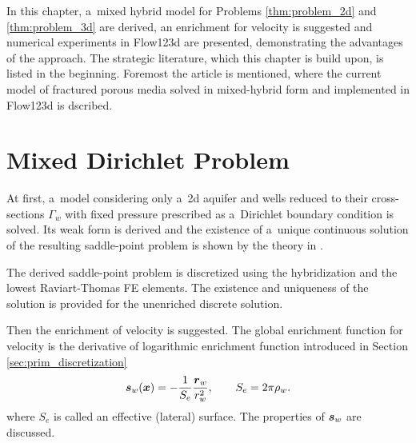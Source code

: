 
In this chapter, a~mixed hybrid model for Problems \ref{thm:problem_2d} and \ref{thm:problem_3d} are derived,
an enrichment for velocity is suggested and numerical experiments in Flow123d are presented, demonstrating
the advantages of the approach.
The strategic literature, which this chapter is build upon, is listed in the beginning.
Foremost the article \cite{sistek_bddc_2015} is mentioned, where the current model 
of fractured porous media solved in mixed-hybrid form and implemented in Flow123d is dscribed.


\section{Mixed Dirichlet Problem}
At first, a~model considering only a~2d aquifer and wells reduced to their cross-sections $\Gamma_w$
with fixed pressure prescribed as a~Dirichlet boundary condition is solved.
Its weak form is derived and the existence of a~unique continuous solution of the resulting saddle-point
problem is shown by the theory in \cite{brezzi_mixed_1991}.

The derived saddle-point problem is discretized using the hybridization and the lowest Raviart-Thomas FE elements.
The existence and uniqueness of the solution is provided for the unenriched discrete solution.

Then the enrichment of velocity is suggested.
The global enrichment function for velocity is the derivative of logarithmic enrichment function introduced in Section \ref{sec:prim_discretization}
\begin{equation}
    \mathbf{\boldsymbol{s}}_w(\mathbf{\boldsymbol{x}}) = -\frac{1}{S_e} \frac{\mathbf{\boldsymbol{r}}_w}{r_w^2}, \qquad S_e = 2\pi\rho_w.
\end{equation}
where $S_e$ is called an effective (lateral) surface.
The properties of $\mathbf{\boldsymbol{s}}_w$ are discussed.

